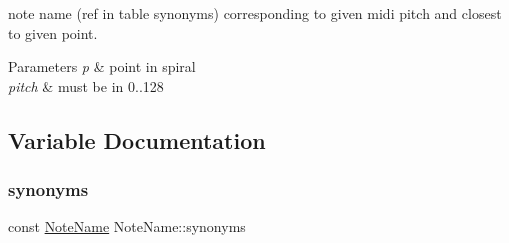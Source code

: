 note name (ref in table synonyms) corresponding to given midi pitch and closest to given point. 


\begin{DoxyParams}{Parameters}
{\em p} & point in spiral \\
\hline
{\em pitch} & must be in 0..128 \\
\hline
\end{DoxyParams}


\subsection{Variable Documentation}
\mbox{\label{group__segment_ga8e1cf6e8bac86af1c5cfdc22b36210b2}} 
\subsubsection{\texorpdfstring{synonyms}{synonyms}}
{\footnotesize\ttfamily const \mbox{\hyperlink{structNoteName}{Note\+Name}} Note\+Name\+::synonyms\hspace{0.3cm}{\ttfamily [static]}}

